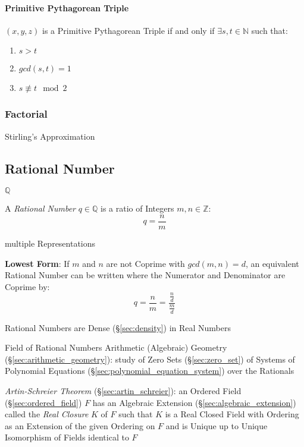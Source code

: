 \paragraph{Primitive Pythagorean Triple}\label{sec:primitive_pythagorean}\hfill

$(x,y,z)$ is a Primitive Pythagorean Triple if and only if $\exists
s,t \in \mathbb{N}$ such that:
\begin{enumerate}
  \item $s > t$
  \item $gcd (s,t) = 1$
  \item $s \not\equiv t \mod 2$
\end{enumerate}



\subsubsection{Factorial}\label{sec:factorial}

Stirling's Approximation



\subsection{Rational Number}\label{sec:rational}

$\mathbb{Q}$

A \emph{Rational Number} $q \in \mathbb{Q}$ is a ratio of Integers
$m,n \in \mathbb{Z}$:
\[
  q = \frac{n}{m}
\]

multiple Representations

\textbf{Lowest Form}: If $m$ and $n$ are not Coprime with $gcd (m,n) =
d$, an equivalent Rational Number can be written where the Numerator
and Denominator are Coprime by:
\[
  q = \frac{n}{m} = \frac{\frac{n}{d}}{\frac{m}{d}}
\]

Rational Numbers are Dense (\S\ref{sec:density}) in Real Numbers

Field of Rational Numbers \fist Arithmetic (Algebraic) Geometry
(\S\ref{sec:arithmetic_geometry}): study of Zero Sets (\S\ref{sec:zero_set}) of
Systems of Polynomial Equations (\S\ref{sec:polynomial_equation_system}) over
the Rationals

\emph{Artin-Schreier Theorem} (\S\ref{sec:artin_schreier}):
an Ordered Field (\S\ref{sec:ordered_field}) $F$ has an Algebraic Extension
(\S\ref{sec:algebraic_extension}) called the \emph{Real Closure} $K$ of $F$
such that $K$ is a Real Closed Field with Ordering as an Extension of the given
Ordering on $F$ and is Unique up to Unique Isomorphism of Fields identical to
$F$

